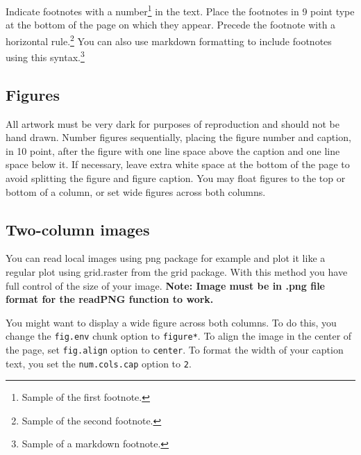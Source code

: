 \documentclass[10pt, letterpaper]{article}
\begin{document}
Indicate footnotes with a number\footnote{Sample of the first
footnote.} in the text. Place the footnotes in 9 point type at the
bottom of the page on which they appear. Precede the footnote with a
horizontal rule.\footnote{Sample of the second footnote.} You can also
use markdown formatting to include footnotes using this
syntax.\footnote{Sample of a markdown footnote.}

\subsection{Figures}\label{figures}

All artwork must be very dark for purposes of reproduction and should
not be hand drawn. Number figures sequentially, placing the figure
number and caption, in 10 point, after the figure with one line space
above the caption and one line space below it. If necessary, leave extra
white space at the bottom of the page to avoid splitting the figure and
figure caption. You may float figures to the top or bottom of a column,
or set wide figures across both columns.

\subsection{Two-column images}\label{two-column-images}

You can read local images using png package for example and plot it like
a regular plot using grid.raster from the grid package. With this method
you have full control of the size of your image. \textbf{Note: Image
must be in .png file format for the readPNG function to work.}

You might want to display a wide figure across both columns. To do this,
you change the \texttt{fig.env} chunk option to \texttt{figure*}. To
align the image in the center of the page, set \texttt{fig.align} option
to \texttt{center}. To format the width of your caption text, you set
the \texttt{num.cols.cap} option to \texttt{2}.
\end{document}
